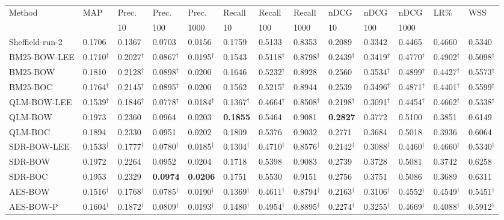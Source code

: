 
\begin{tabular}{l|p{21pt}|p{19pt}p{19pt}p{21pt}|p{19pt}p{19pt}p{21pt}|p{19pt}p{19pt}p{21pt}|p{21pt}|p{19pt}}
	
	\toprule
	Method&MAP&Prec.&Prec.&Prec.&Recall&Recall&Recall&nDCG&nDCG&nDCG&LR\%&WSS\\
	&&10&100&1000&10&100&1000&10&100&1000&&\\\hline
    \addlinespace[2pt]
Sheffield-run-2\cite{alharbi2017ranking}&0.1706&0.1367&0.0703&0.0156&0.1759&0.5133&0.8353&0.2089&0.3342&0.4465&0.4660&0.5340\\\midrule
BM25-BOW-LEE&0.1710$^\dagger$&0.2027$^\dagger$&0.0867$^\dagger$&0.0195$^\dagger$&0.1543&0.5118$^\dagger$&0.8798$^\dagger$&0.2439$^\dagger$&0.3419$^\dagger$&0.4770$^\dagger$&0.4902$^\dagger$&0.5098$^\dagger$\\

BM25-BOW&0.1810&0.2128$^\dagger$&0.0898$^\dagger$&0.0200&0.1646&0.5232$^\dagger$&0.8928&0.2560&0.3534$^\dagger$&0.4899$^\dagger$&0.4427$^\dagger$&0.5573$^\dagger$\\
BM25-BOC&0.1764$^\dagger$&0.2145$^\dagger$&0.0895$^\dagger$&0.0200&0.1562&0.5215$^\dagger$&0.8944&0.2539&0.3496$^\dagger$&0.4871$^\dagger$&0.4401$^\dagger$&0.5599$^\dagger$\\\midrule

QLM-BOW-LEE&0.1539$^\dagger$&0.1846$^\dagger$&0.0778$^\dagger$&0.0184$^\dagger$&0.1367$^\dagger$&0.4664$^\dagger$&0.8508$^\dagger$&0.2198$^\dagger$&0.3091$^\dagger$&0.4454$^\dagger$&0.4662$^\dagger$&0.5338$^\dagger$\\
QLM-BOW&0.1973&0.2360&0.0964&0.0203&\textbf{0.1855}&0.5464&0.9081&\textbf{0.2827}&0.3772&0.5100&0.3851&0.6149\\
QLM-BOC&0.1894&0.2330&0.0951&0.0202&0.1809&0.5376&0.9032&0.2771&0.3684&0.5018&0.3936&0.6064\\\midrule
SDR-BOW-LEE&0.1533$^\dagger$&0.1777$^\dagger$&0.0780$^\dagger$&0.0185$^\dagger$&0.1304$^\dagger$&0.4710$^\dagger$&0.8576$^\dagger$&0.2142$^\dagger$&0.3088$^\dagger$&0.4460$^\dagger$&0.4660$^\dagger$&0.5340$^\dagger$\\
SDR-BOW&0.1972&0.2264&0.0952&0.0204&0.1718&0.5398&0.9083&0.2739&0.3728&0.5081&0.3742&0.6258\\
SDR-BOC&0.1953&0.2329&\textbf{0.0974}&\textbf{0.0206}&0.1751&0.5530&0.9151&0.2756&0.3751&0.5086&0.3689&0.6311\\\midrule


AES-BOW&0.1516$^\dagger$&0.1768$^\dagger$&0.0785$^\dagger$&0.0190$^\dagger$&0.1369$^\dagger$&0.4611$^\dagger$&0.8794$^\dagger$&0.2163$^\dagger$&0.3106$^\dagger$&0.4552$^\dagger$&0.4549$^\dagger$&0.5451$^\dagger$\\
AES-BOW-P&0.1604$^\dagger$&0.1872$^\dagger$&0.0809$^\dagger$&0.0193$^\dagger$&0.1480$^\dagger$&0.4954$^\dagger$&0.8895$^\dagger$&0.2274$^\dagger$&0.3255$^\dagger$&0.4669$^\dagger$&0.4088$^\dagger$&0.5912$^\dagger$\\\midrule


\end{tabular}
